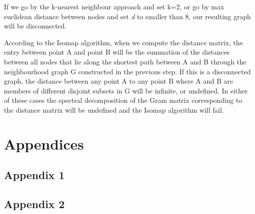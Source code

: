 \documentclass[11pt,a4paper,landscape]{article}
\begin{document}
If we go by the k-nearest neighbour approach and set k=2, or go by max euclidean distance between nodes and set \textit{d} to smaller than 8, our resulting graph will be disconnected.


According to the Isomap algorithm, when we compute the distance matrix, the entry between point A and point B will be the summation of the distances between all nodes that lie along the shortest path between A and B through the neighbourhood graph G constructed in the previous step. If this is a disconnected graph, the distance between any point A to any point B where A and B are members of different disjoint subsets in G will be infinite, or undefined. In either of these cases the spectral decomposition of the Gram matrix corresponding to the distance matrix will be undefined and the Isomap algorithm will fail.




\section{Appendices}
\subsection{Appendix 1}

\subsection{Appendix 2}

\end{document}
